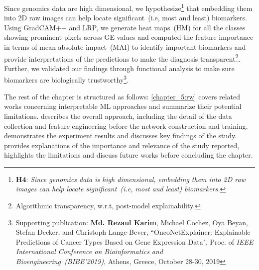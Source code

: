 \hspace*{3.5mm} Since genomics data are high dimensional, we hypothesize\footnote{\textbf{H4}: \textit{Since genomics data is high dimensional, embedding them into 2D raw images can help locate significant~(i.e, most and least) biomarkers.}} that embedding them into 2D raw images can help locate significant~(i.e, most and least) biomarkers. 
Using GradCAM++ and LRP, we generate heat maps~(HM) for all the classes showing prominent pixels across GE values and computed the feature importance in terms of mean absolute impact~(MAI) to identify important biomarkers and provide interpretations of the predictions to make the diagnosis transparent\footnote{Algorithmic transparency, w.r.t, post-model explainability.}. Further, we validated our findings through functional analysis to make sure biomarkers are biologically trustworthy\footnote{Supporting publication: \textbf{Md. Rezaul Karim}, Michael Cochez, Oya Beyan, Stefan Decker, and Christoph Lange-Bever, ``OncoNetExplainer: Explainable Predictions of Cancer Types Based on Gene Expression Data", Proc. of \emph{IEEE International Conference on Bioinformatics and Bioengineering~(BIBE'2019)}, Athens, Greece, October 28-30, 2019}. %

\hspace*{3.5mm} The rest of the chapter is structured as follows: \cref{chapter_5:rw} covers related works concerning interpretable ML approaches and summarize their potential limitations.  describes the overall approach, including the detail of the data collection and feature engineering before the network construction and training.  demonstrates the experiment results and discusses key findings of the study.  provides explanations of the importance and relevance of the study reported, highlights the limitations and discuss future works before concluding the chapter.

